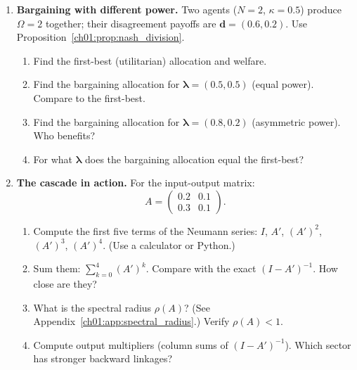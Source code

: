 \documentclass[../structural_economics_book.tex]{subfiles}
\begin{document}
\begin{enumerate}[label=\textbf{1.\arabic*}, leftmargin=3em]
\item \textbf{Bargaining with different power.} Two agents ($N = 2$, $\kappa = 0.5$) produce $\Omega = 2$ together; their disagreement payoffs are $\mathbf{d} = (0.6, 0.2)$. Use Proposition~\ref{ch01:prop:nash_division}.
\begin{enumerate}
\item Find the first-best (utilitarian) allocation and welfare.
\item Find the bargaining allocation for $\boldsymbol{\lambda} = (0.5, 0.5)$ (equal power). Compare to the first-best.
\item Find the bargaining allocation for $\boldsymbol{\lambda} = (0.8, 0.2)$ (asymmetric power). Who benefits?
\item For what $\boldsymbol{\lambda}$ does the bargaining allocation equal the first-best?
\end{enumerate}

\item \textbf{The cascade in action.} For the input-output matrix:
\begin{equation}
A = \begin{pmatrix} 0.2 & 0.1 \\ 0.3 & 0.1 \end{pmatrix}.
\end{equation}
\begin{enumerate}
\item Compute the first five terms of the Neumann series: $I$, $A'$, $(A')^2$, $(A')^3$, $(A')^4$. (Use a calculator or Python.)
\item Sum them: $\sum_{k=0}^4 (A')^k$. Compare with the exact $(I - A')^{-1}$. How close are they?
\item What is the spectral radius $\rho(A)$? (See Appendix~\ref{ch01:app:spectral_radius}.) Verify $\rho(A) < 1$.
\item Compute output multipliers (column sums of $(I - A')^{-1}$). Which sector has stronger backward linkages?
\end{enumerate}


\end{enumerate}
\end{document}
